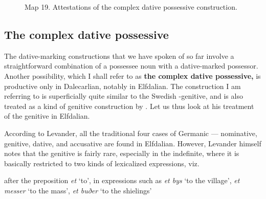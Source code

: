 {{\begin{figure}[h]
\begin{minipage}{3.9625in}
Map 19. Attestations of the complex dative possessive construction.


\end{minipage}

\end{figure}

\subsection{The complex dative possessive}
\label{bkm:Ref224373337}
The dative-marking constructions that we have spoken of so far involve a straightforward combination of a possessee noun with a dative-marked possessor. Another possibility, which I shall refer to as \textbf{the complex dative possessive,} is productive only in Dalecarlian, notably in Elfdalian. The construction I am referring to is superficially quite similar to the Swedish -genitive, and is also treated as a kind of genitive construction by \citet{Levander1909}. Let us thus look at his treatment of the genitive in Elfdalian.


According to Levander, all the traditional four cases of Germanic — nominative, genitive, dative, and accusative are found in Elfdalian. However, Levander himself notes that the genitive is fairly rare, especially in the indefinite, where it is basically restricted to two kinds of lexicalized expressions, viz. 


\item 

after the preposition \textit{et} ‘to’, in expressions such as \textit{et bys} ‘to the village’, \textit{et messer} ‘to the mass’, \textit{et buðer} ‘to the shielings’


\item 

}}
